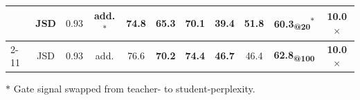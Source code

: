 \begin{table}[ht]
\begin{tabular}{l|ccc|cccccc|c}
                             & JSD          & $0.93$                              & add.\textsuperscript{$\ast$} & 74.8            & 65.3            & 70.1            & 39.4            & \textbf{51.8}    & 60.3\textsubscript{@20}\textsuperscript{$\ast$} & \textbf{10.0$\times$} \\
    \cmidrule{2-11}
    \rowcolor{antisdrow}{}   & {JSD}        & {0.93}                              & {add.}                       & 76.6            & \textbf{70.2}   & \textbf{74.4}   & \textbf{46.7}   & 46.4             & \textbf{62.8\textsubscript{@100}}               & \textbf{10.0$\times$} \\
    \bottomrule
  \end{tabular}
  \par\smallskip
  {\footnotesize $\ast$ Gate signal swapped from teacher- to student-perplexity.}
  \vspace{-.5em}
\end{table}
